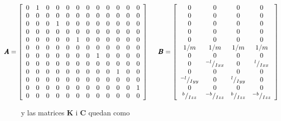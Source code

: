 \documentclass[twoside,11pt]{book}
\begin{document}
\begin{equation}
\hspace*{-0.9cm}\pmb{A}=\left[ \begin{array}{cccccccccccc}
0 & 1 & 0 & 0 & 0 & 0 & 0 & 0 & 0 & 0 & 0 & 0 \\
0 & 0 & 0 & 0 & 0 & 0 & 0 & 0 & 0 & 0 & 0 & 0 \\
0 & 0 & 0 & 1 & 0 & 0 & 0 & 0 & 0 & 0 & 0 & 0 \\
0 & 0 & 0 & 0 & 0 & 0 & 0 & 0 & 0 & 0 & 0 & 0 \\
0 & 0 & 0 & 0 & 0 & 1 & 0 & 0 & 0 & 0 & 0 & 0 \\
0 & 0 & 0 & 0 & 0 & 0 & 0 & 0 & 0 & 0 & 0 & 0 \\
0 & 0 & 0 & 0 & 0 & 0 & 0 & 1 & 0 & 0 & 0 & 0 \\
0 & 0 & 0 & 0 & 0 & 0 & 0 & 0 & 0 & 0 & 0 & 0 \\
0 & 0 & 0 & 0 & 0 & 0 & 0 & 0 & 0 & 1 & 0 & 0 \\
0 & 0 & 0 & 0 & 0 & 0 & 0 & 0 & 0 & 0 & 0 & 0 \\
0 & 0 & 0 & 0 & 0 & 0 & 0 & 0 & 0 & 0 & 0 & 1 \\
0 & 0 & 0 & 0 & 0 & 0 & 0 & 0 & 0 & 0 & 0 & 0 \\ \end{array} \right] \hspace*{0.5cm} \pmb{B} = \left[ \begin{array}{cccc}
0 & 0 & 0 & 0 \\
0 & 0 & 0 & 0 \\
0 & 0 & 0 & 0 \\
0 & 0 & 0 & 0 \\
0 & 0 & 0 & 0 \\
1/m & 1/m & 1/m & 1/m \\ 
0 & 0 & 0 & 0 \\
0 & {}^{-l}/_{Ixx} & 0 & {}^{l}/_{Ixx} \\ 
0 & 0 & 0 & 0 \\
{}^{-l}/_{Iyy} & 0 & {}^{l}/_{Iyy} & 0 \\
0 & 0 & 0 & 0 \\
{}^{b}/_{Izz} & {}^{-b}/_{Izz} & {}^{b}/_{Izz} & {}^{-b}/_{Izz} \\ \end{array} \right]
\end{equation}

y las matrices $\pmb{K}$ i $\pmb{C}$ quedan como 
\end{document}
